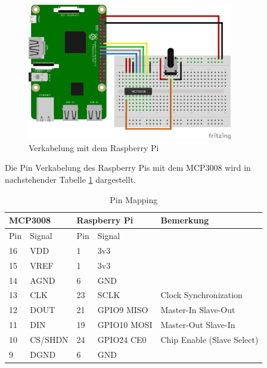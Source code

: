 \documentclass{article}
\begin{document}
\begin{figure}[h!]
    \centering
    \includegraphics[width=0.8\textwidth]{RPi-Fritzing-Potentiometer_bb.png}
    \caption{Verkabelung mit dem Raspberry Pi}
    \label{fig:ADC-Verkabelung}
\end{figure}

Die Pin Verkabelung des Raspberry Pis mit dem MCP3008 wird in nachstehender Tabelle \ref{tab:Verkabelung} dargestellt. 
\begin{table}[h!]
    \begin{tabular}{|l|l|l|l|l|}
    \hline
    \multicolumn{2}{|l|}{\textbf{MCP3008}} & \multicolumn{2}{l|}{\textbf{Raspberry Pi}} & \textbf{Bemerkung}         \\ \hline
    Pin         & Signal          & Pin         & Signal              &                            \\ \hline
    16          & VDD             & 1           & 3v3                 &                            \\ \hline
    15          & VREF            & 1           & 3v3                 &                            \\ \hline
    14          & AGND            & 6           & GND                 &                            \\ \hline
    13          & CLK             & 23          & SCLK                & Clock Synchronization      \\ \hline
    12          & DOUT            & 21          & GPIO9 MISO          & Master-In Slave-Out        \\ \hline
    11          & DIN             & 19          & GPIO10 MOSI         & Master-Out Slave-In        \\ \hline
    10          & CS/SHDN         & 24          & GPIO24 CE0          & Chip Enable (Slave Select) \\ \hline
    9           & DGND            & 6           & GND                 &                            \\ \hline
    \end{tabular}
    \caption{Pin Mapping}
    \label{tab:Verkabelung}
\end{table}
\end{document}

